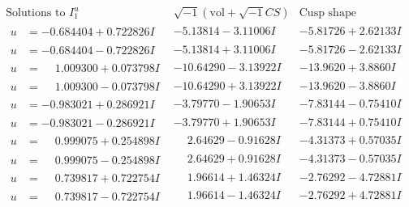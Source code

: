 \documentclass[1p]{elsarticle_modified}
\theoremstyle{definition}
\newcommand{\I}{\sqrt{-1}}
\begin{document}
$$\begin{array}{c|c|c}  
\text{Solutions to }I^u_{1}& \I (\text{vol} + \sqrt{-1}CS) & \text{Cusp shape}\\
 \hline 
\begin{aligned}
u &= -0.684404 + 0.722826 I\end{aligned}
 & -5.13814 - 3.11006 I & -5.81726 + 2.62133 I \\ \hline\begin{aligned}
u &= -0.684404 - 0.722826 I\end{aligned}
 & -5.13814 + 3.11006 I & -5.81726 - 2.62133 I \\ \hline\begin{aligned}
u &= \phantom{-}1.009300 + 0.073798 I\end{aligned}
 & -10.64290 - 3.13922 I & -13.9620 + 3.8860 I \\ \hline\begin{aligned}
u &= \phantom{-}1.009300 - 0.073798 I\end{aligned}
 & -10.64290 + 3.13922 I & -13.9620 - 3.8860 I \\ \hline\begin{aligned}
u &= -0.983021 + 0.286921 I\end{aligned}
 & -3.79770 - 1.90653 I & -7.83144 - 0.75410 I \\ \hline\begin{aligned}
u &= -0.983021 - 0.286921 I\end{aligned}
 & -3.79770 + 1.90653 I & -7.83144 + 0.75410 I \\ \hline\begin{aligned}
u &= \phantom{-}0.999075 + 0.254898 I\end{aligned}
 & \phantom{-}2.64629 - 0.91628 I & -4.31373 + 0.57035 I \\ \hline\begin{aligned}
u &= \phantom{-}0.999075 - 0.254898 I\end{aligned}
 & \phantom{-}2.64629 + 0.91628 I & -4.31373 - 0.57035 I \\ \hline\begin{aligned}
u &= \phantom{-}0.739817 + 0.722754 I\end{aligned}
 & \phantom{-}1.96614 + 1.46324 I & -2.76292 - 4.72881 I \\ \hline\begin{aligned}
u &= \phantom{-}0.739817 - 0.722754 I\end{aligned}
 & \phantom{-}1.96614 - 1.46324 I & -2.76292 + 4.72881 I \\ \hline\begin{aligned}

\end{aligned}
\end{array}$$
\end{document}

